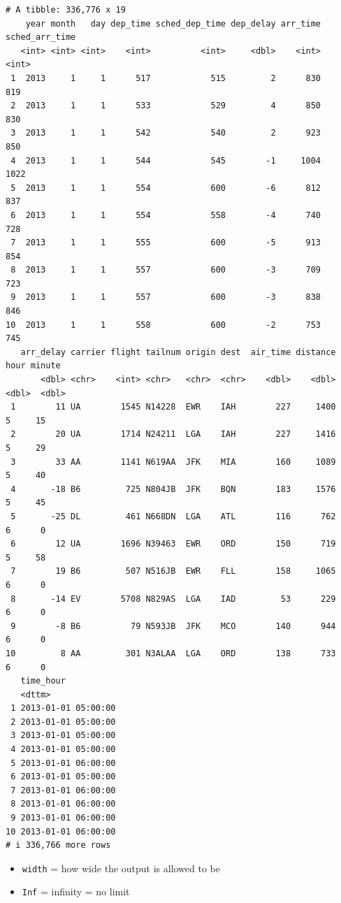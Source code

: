 \documentclass[
  letterpaper,
  DIV=11,
  numbers=noendperiod]{scrreprt}
\providecommand{\tightlist}{%
  \setlength{\itemsep}{0pt}\setlength{\parskip}{0pt}}
\begin{document}
\begin{verbatim}
# A tibble: 336,776 x 19
    year month   day dep_time sched_dep_time dep_delay arr_time sched_arr_time
   <int> <int> <int>    <int>          <int>     <dbl>    <int>          <int>
 1  2013     1     1      517            515         2      830            819
 2  2013     1     1      533            529         4      850            830
 3  2013     1     1      542            540         2      923            850
 4  2013     1     1      544            545        -1     1004           1022
 5  2013     1     1      554            600        -6      812            837
 6  2013     1     1      554            558        -4      740            728
 7  2013     1     1      555            600        -5      913            854
 8  2013     1     1      557            600        -3      709            723
 9  2013     1     1      557            600        -3      838            846
10  2013     1     1      558            600        -2      753            745
   arr_delay carrier flight tailnum origin dest  air_time distance  hour minute
       <dbl> <chr>    <int> <chr>   <chr>  <chr>    <dbl>    <dbl> <dbl>  <dbl>
 1        11 UA        1545 N14228  EWR    IAH        227     1400     5     15
 2        20 UA        1714 N24211  LGA    IAH        227     1416     5     29
 3        33 AA        1141 N619AA  JFK    MIA        160     1089     5     40
 4       -18 B6         725 N804JB  JFK    BQN        183     1576     5     45
 5       -25 DL         461 N668DN  LGA    ATL        116      762     6      0
 6        12 UA        1696 N39463  EWR    ORD        150      719     5     58
 7        19 B6         507 N516JB  EWR    FLL        158     1065     6      0
 8       -14 EV        5708 N829AS  LGA    IAD         53      229     6      0
 9        -8 B6          79 N593JB  JFK    MCO        140      944     6      0
10         8 AA         301 N3ALAA  LGA    ORD        138      733     6      0
   time_hour          
   <dttm>             
 1 2013-01-01 05:00:00
 2 2013-01-01 05:00:00
 3 2013-01-01 05:00:00
 4 2013-01-01 05:00:00
 5 2013-01-01 06:00:00
 6 2013-01-01 05:00:00
 7 2013-01-01 06:00:00
 8 2013-01-01 06:00:00
 9 2013-01-01 06:00:00
10 2013-01-01 06:00:00
# i 336,766 more rows
\end{verbatim}

\begin{itemize}
\tightlist
\item
  \texttt{width} = how wide the output is allowed to be
\item
  \texttt{Inf} = infinity = no limit
\end{itemize}
\end{document}
